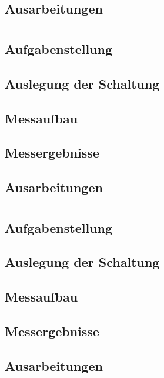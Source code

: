 		\subsection{Ausarbeitungen}

	\section{}
		\subsection{Aufgabenstellung}

		\subsection{Auslegung der Schaltung}

		\subsection{Messaufbau}

		\subsection{Messergebnisse}

		\subsection{Ausarbeitungen}

	\section{}
		\subsection{Aufgabenstellung}

		\subsection{Auslegung der Schaltung}

		\subsection{Messaufbau}

		\subsection{Messergebnisse}

		\subsection{Ausarbeitungen}